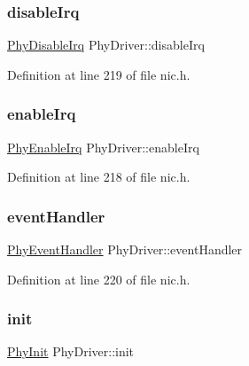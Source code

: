 \subsubsection{\texorpdfstring{disable\+Irq}{disableIrq}}
{\footnotesize\ttfamily \hyperlink{nic_8h_a190fda514154e83e25ffcc6c69f59714}{Phy\+Disable\+Irq} Phy\+Driver\+::disable\+Irq}



Definition at line 219 of file nic.\+h.

\mbox{\label{structPhyDriver_a246bf3432a98242439262e35d2dd9b32}} 
\subsubsection{\texorpdfstring{enable\+Irq}{enableIrq}}
{\footnotesize\ttfamily \hyperlink{nic_8h_a439e57db4994b903e75b9ebfedaec34f}{Phy\+Enable\+Irq} Phy\+Driver\+::enable\+Irq}



Definition at line 218 of file nic.\+h.

\mbox{\label{structPhyDriver_a0fc363b870ed98a33e24d878f8998216}} 
\subsubsection{\texorpdfstring{event\+Handler}{eventHandler}}
{\footnotesize\ttfamily \hyperlink{nic_8h_a3822e27f4410b42d46b452bbbafb062e}{Phy\+Event\+Handler} Phy\+Driver\+::event\+Handler}



Definition at line 220 of file nic.\+h.

\mbox{\label{structPhyDriver_a3b418c8679554610728e3c55ac4a9bfd}} 
\subsubsection{\texorpdfstring{init}{init}}
{\footnotesize\ttfamily \hyperlink{nic_8h_afc0573cbc6dfafe78e7fbea63f882e81}{Phy\+Init} Phy\+Driver\+::init}



